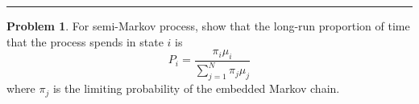 \documentclass[a4paper, 10pt]{article}
\theoremstyle{definition}
\newtheorem{problem}{Problem}
\theoremstyle{hSol}
\begin{document}
\noindent\rule{16cm}{0.4pt}
\begin{problem} For semi-Markov process, show that the long-run proportion of time that the process spends in state $i$ is
$$
P_i = \frac{\pi_i \mu_i}{\sum_{j=1}^N \pi_j \mu_j}
$$
where $\pi_j$ is the limiting probability of the embedded Markov chain.
\end{problem}
\end{document}
